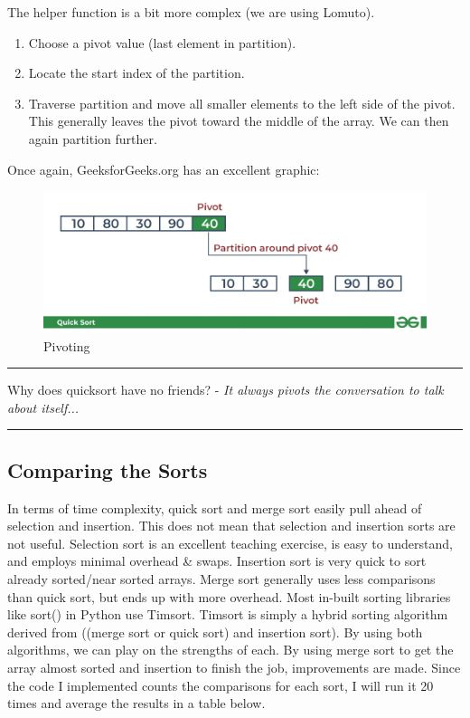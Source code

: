 \documentclass[letterpaper, 10pt]{article}
\begin{document}
\newpage
 
The helper function is a bit more complex (we are using Lomuto).
\begin{enumerate}
    \item Choose a pivot value (last element in partition).
    \item Locate the start index of the partition.
    \item Traverse partition and move all smaller elements to the left side of the pivot. This generally leaves the pivot toward the middle of the array. We can then again partition further.
\end{enumerate}
Once again, GeeksforGeeks.org has an excellent graphic: 
\begin{figure}[h]
    \centering
    \includegraphics[width=1\linewidth]{pivoting.png}
    \caption{Pivoting}
    \label{fig:enter-label}
\end{figure}

\hrule
\vspace{.25cm}
Why does quicksort have no friends? - \textit{It always pivots the conversation to talk about itself...}
\vspace{.25cm}
\hrule

\subsection{Comparing the Sorts}
In terms of time complexity, quick sort and merge sort easily pull ahead of selection and insertion. This does not mean that selection and insertion sorts are not useful. Selection sort is an excellent teaching exercise, is easy to understand, and employs minimal overhead \& swaps. Insertion sort is very quick to sort already sorted/near sorted arrays. Merge sort generally uses less comparisons than quick sort, but ends up with more overhead. Most in-built sorting libraries like sort() in Python use Timsort. Timsort is simply a hybrid sorting algorithm derived from ((merge sort or quick sort) and insertion sort). By using both algorithms, we can play on the strengths of each. By using merge sort to get the array almost sorted and insertion to finish the job, improvements are made. Since the code I implemented counts the comparisons for each sort, I will run it 20 times and average the results in a table below.
\end{document}
